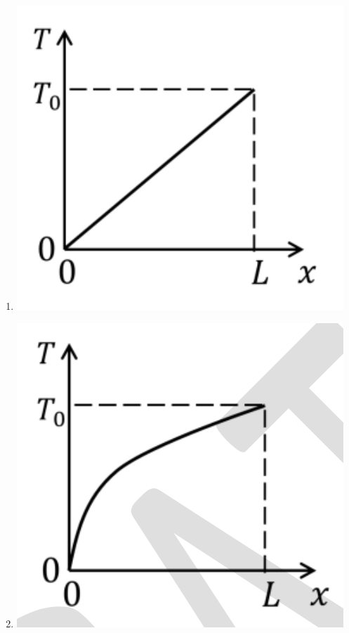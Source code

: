 \documentclass[journal,11pt,onecolumn]{IEEEtran}
\begin{document}
\begin{enumerate}[resume]
          \begin{enumerate}
              \item \includegraphics[scale=0.2]{o17a}
              \item \includegraphics[scale=0.2]{o17b}

\end{enumerate}
\end{enumerate}
\end{document}
